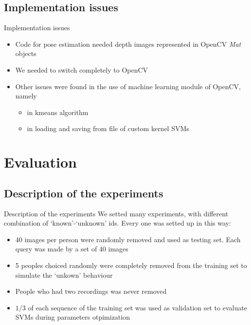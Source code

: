 \documentclass{beamer}
\begin{document}
\subsection{Implementation issues}
\begin{frame}{Implementation issues}
	\begin{itemize}
		\item Code for pose estimation needed depth images represented
			in OpenCV \textit{Mat} objects
		\item We needed to switch completely to OpenCV
		\item Other issues were found in the use of machine learning
			module of OpenCV, namely
			\begin{itemize}
				\item in kmeans algorithm
				\item in loading and saving from file of custom
					kernel SVMs
			\end{itemize}
	\end{itemize}
\end{frame}

\section{Evaluation}
\subsection{Description of the experiments}
\begin{frame}{Description of the experiments}
	We setted many experiments, with different combination of
	`known'-`unknown' ids. Every one was setted up in this way:
	\begin{itemize}
		\item 40 images per person were randomly removed and used as
			testing set. Each query was made by a set of 40 images
		\item 5 peoples choiced randomly were completely removed from
			the training set to simulate the `unkown' behaviour
		\item People who had two recordings was never removed
		\item $1/3$ of each sequence of the training set was used as
			validation set to evaluate SVMs during parameters
			otpimization
	\end{itemize}
\end{frame}
\end{document}
